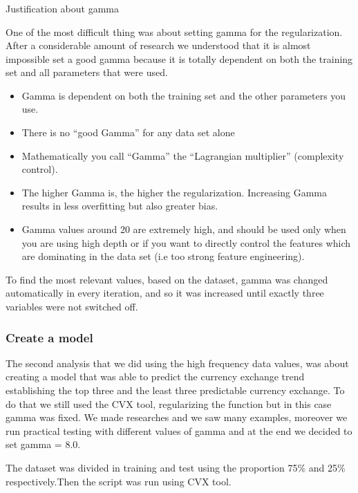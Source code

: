 \subsubsection{}{Justification about gamma \\}

One of the most difficult thing was about setting gamma for the regularization. After a considerable amount of research we understood that it is almost impossible set a good gamma because it is totally dependent on both the training set and all parameters that were used\cite{philip2011artificial}. 

\begin{itemize}
\item Gamma is dependent on both the training set and the other parameters you use.
\item There is no “good Gamma” for any data set alone
\item Mathematically you call “Gamma” the “Lagrangian multiplier” (complexity control).
\item The higher Gamma is, the higher the regularization. Increasing Gamma results in less overfitting but also greater bias.
\item Gamma values around 20 are extremely high, and should be used only when you are using high depth or if you want to directly control the features which are dominating in the data set (i.e too strong feature engineering). 

\end{itemize}

To find the most relevant values, based on the dataset, gamma was changed automatically in every iteration, and so it was increased until exactly three variables were not switched off.

\subsubsection{Create a model}
The second analysis that we did using the high frequency data values, was about creating a model that was able to predict the currency exchange trend establishing the top three and the least three predictable currency exchange. To do that we still used the CVX tool, regularizing the function but in this case gamma was fixed. We made researches and we saw many examples, moreover we run practical testing with different values of gamma and at the end we decided to set gamma = 8.0.

The dataset was divided in training and test using the proportion 75\% and 25\% respectively.Then the script was run using CVX tool. 


